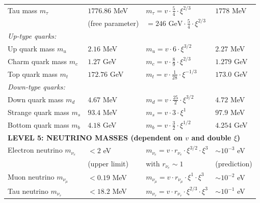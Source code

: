 \documentclass[12pt,a4paper]{report}
\begin{document}
\begin{longtable}{p{4.0cm}p{3.2cm}p{2.8cm}p{2.8cm}}
	Tau mass $m_\tau$ & $1776.86$ MeV & $m_\tau = v \cdot \frac{5}{4} \cdot \xi^{2/3}$ & $1778$ MeV \\
	& (free parameter) & $= 246 \text{ GeV} \cdot \frac{5}{4} \cdot \xi^{2/3}$ & \\[0.3em]
	
	\multicolumn{4}{l}{\textit{Up-type quarks:}} \\
	
	Up quark mass $m_u$ & $2.16$ MeV & $m_u = v \cdot 6 \cdot \xi^{3/2}$ & $2.27$ MeV \\
	
	Charm quark mass $m_c$ & $1.27$ GeV & $m_c = v \cdot \frac{8}{9} \cdot \xi^{2/3}$ & $1.279$ GeV \\
	
	Top quark mass $m_t$ & $172.76$ GeV & $m_t = v \cdot \frac{1}{28} \cdot \xi^{-1/3}$ & $173.0$ GeV \\
	
	\multicolumn{4}{l}{\textit{Down-type quarks:}} \\
	
	Down quark mass $m_d$ & $4.67$ MeV & $m_d = v \cdot \frac{25}{2} \cdot \xi^{3/2}$ & $4.72$ MeV \\
	
	Strange quark mass $m_s$ & $93.4$ MeV & $m_s = v \cdot 3 \cdot \xi^1$ & $97.9$ MeV \\
	
	Bottom quark mass $m_b$ & $4.18$ GeV & $m_b = v \cdot \frac{3}{2} \cdot \xi^{1/2}$ & $4.254$ GeV \\
	
	\midrule
	\multicolumn{4}{l}{\textbf{LEVEL 5: NEUTRINO MASSES (dependent on $v$ and double $\xi$)}} \\
	\midrule
	
	Electron neutrino $m_{\nu_e}$ & $< 2$ eV & $m_{\nu_e} = v \cdot r_{\nu_e} \cdot \xi^{3/2} \cdot \xi^3$ & $\sim 10^{-3}$ eV \\
	& (upper limit) & with $r_{\nu_e} \sim 1$ & (prediction) \\[0.3em]
	
	Muon neutrino $m_{\nu_\mu}$ & $< 0.19$ MeV & $m_{\nu_\mu} = v \cdot r_{\nu_\mu} \cdot \xi^{1} \cdot \xi^3$ & $\sim 10^{-2}$ eV \\
	
	Tau neutrino $m_{\nu_\tau}$ & $< 18.2$ MeV & $m_{\nu_\tau} = v \cdot r_{\nu_\tau} \cdot \xi^{2/3} \cdot \xi^3$ & $\sim 10^{-1}$ eV \\
	

\end{longtable}
\end{document}
